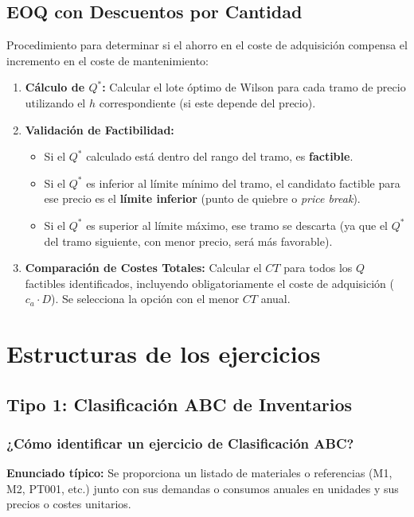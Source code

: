 \documentclass[11pt,a4paper]{article}
\begin{document}
\subsection{EOQ con Descuentos por Cantidad}

Procedimiento para determinar si el ahorro en el coste de adquisición compensa el incremento en el coste de mantenimiento:

\begin{enumerate}
    \item \textbf{Cálculo de $Q^{*}$:} Calcular el lote óptimo de Wilson para cada tramo de precio utilizando el $h$ correspondiente (si este depende del precio).
    \item \textbf{Validación de Factibilidad:}
          \begin{itemize}
              \item Si el $Q^{*}$ calculado está dentro del rango del tramo, es \textbf{factible}.
              \item Si el $Q^{*}$ es inferior al límite mínimo del tramo, el candidato factible para ese precio es el \textbf{límite inferior} (punto de quiebre o \emph{price break}).
              \item Si el $Q^{*}$ es superior al límite máximo, ese tramo se descarta (ya que el $Q^{*}$ del tramo siguiente, con menor precio, será más favorable).
          \end{itemize}
    \item \textbf{Comparación de Costes Totales:} Calcular el $CT$ para todos los $Q$ factibles identificados, incluyendo obligatoriamente el coste de adquisición ($c_a \cdot D$). Se selecciona la opción con el menor $CT$ anual.

\end{enumerate}

\clearpage
\section{Estructuras de los ejercicios}
\subsection{Tipo 1: Clasificación ABC de Inventarios}
\subsubsection{¿Cómo identificar un ejercicio de Clasificación ABC?}
\textbf{Enunciado típico:} Se proporciona un listado de materiales o referencias (M1, M2, PT001, etc.) junto con sus demandas o consumos anuales en unidades y sus precios o costes unitarios.
\end{document}
